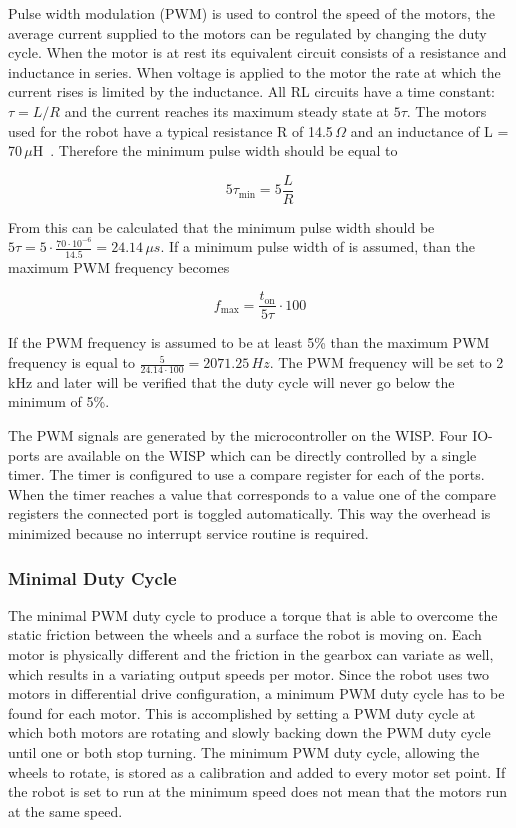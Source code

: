 Pulse width modulation (PWM) is used to control the speed of the motors, the average current supplied to the motors can be regulated by changing the duty cycle.
When the motor is at rest its equivalent circuit consists of a resistance and inductance in series.
When voltage is applied to the motor the rate at which the current rises is limited by the inductance. 
All RL circuits have a time constant: $\tau = L / R$ and the current reaches its maximum steady state at $5\tau$. 
The motors used for the robot have a typical resistance R of 14.5\,$\Omega$ and an inductance of L = 70\,$\mu$H~\cite{gearmotor_206-110_2017}.
Therefore the minimum pulse width should be equal to

\begin{equation}
5\tau_{\min} = 5 \frac{L}{R} 
\end{equation}

From this can be calculated that the minimum pulse width should be $5\tau = 5 \cdot \frac{70 \cdot 10^{-6}}{14.5} = 24.14\,\mu s$.
If a minimum pulse width of is assumed, than the maximum PWM frequency becomes

\begin{equation}
f_{\max} = \frac{t_{\text{on}}}{5\tau}\cdot 100
\end{equation}

If the PWM frequency is assumed to be at least 5\% than the maximum PWM frequency is equal to $\frac{5}{24.14 \cdot 100} = 2071.25\,Hz$.
The PWM frequency will be set to 2\,kHz and later will be verified that the duty cycle will never go below the minimum of 5\%.

The PWM signals are generated by the microcontroller on the WISP.
Four IO-ports are available on the WISP which can be directly controlled by a single timer.
The timer is configured to use a compare register for each of the ports.
When the timer reaches a value that corresponds to a value one of the compare registers the connected port is toggled automatically.
This way the overhead is minimized because no interrupt service routine is required.

\subsubsection{Minimal Duty Cycle}

The minimal PWM duty cycle to produce a torque that is able to overcome the static friction between the wheels and a surface the robot is moving on.
Each motor is physically different and the friction in the gearbox can variate as well, which results in a variating output speeds per motor.
Since the robot uses two motors in differential drive configuration, a minimum PWM duty cycle has to be found for each motor.
This is accomplished by setting a PWM duty cycle at which both motors are rotating and slowly backing down the PWM duty cycle until one or both stop turning.
The minimum PWM duty cycle, allowing the wheels to rotate, is stored as a calibration and added to every motor set point.
If the robot is set to run at the minimum speed does not mean that the motors run at the same speed.


